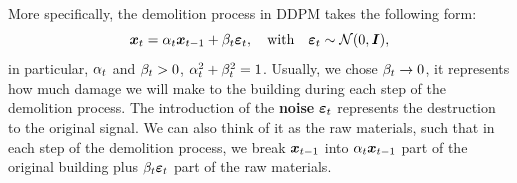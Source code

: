 More specifically, the demolition process in DDPM takes the following form:
\begin{equation}
    \label{eq:1.3}
    \bm{x}_{t}=\alpha_t\bm{x}_{t-1}+\beta_t\bm{\varepsilon}_t,\quad\mbox{with}\quad\bm{\varepsilon}_t\sim \mathcal{N}(0,\bm{I}),
\end{equation}
in particular, $\alpha_t$ and $\beta_t>0$, $\alpha_t^2+\beta_t^2=1$. Usually, we chose $\beta_t\to0$, it represents how much damage we will make to the building during each step of the demolition process. The introduction of the \textbf{noise} $\bm{\varepsilon}_t$ represents the destruction to the original signal. We can also think of it as the raw materials, such that in each step of the demolition process, we break $\bm{x}_{t-1}$ into $\alpha_t \bm{x}_{t-1}$ part of the original building plus $\beta_t\bm{\varepsilon}_t$ part of the raw materials.

